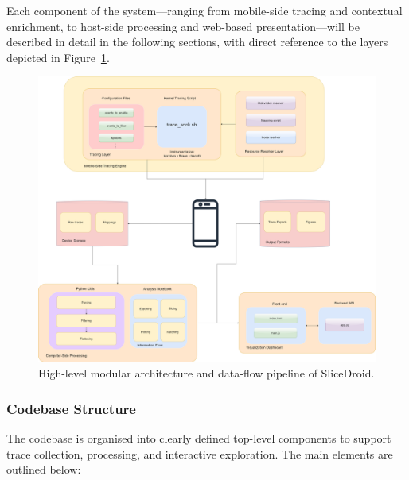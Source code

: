 \documentclass[a4paper,12pt]{report}
\begin{document}
Each component of the system—ranging from mobile-side tracing and contextual enrichment, to host-side processing and web-based presentation—will be described in detail in the following sections, with direct reference to the layers depicted in Figure~\ref{fig:architecture}.
\begin{figure}[H]
\centering
\includegraphics[width=1\textwidth]{architecture.png}
\caption{High-level modular architecture and data-flow pipeline of SliceDroid.}
\label{fig:architecture}
\end{figure}



\subsubsection{Codebase Structure}

The codebase is organised into clearly defined top-level components to support trace collection, processing, and interactive exploration. The main elements are outlined below:
\end{document}
